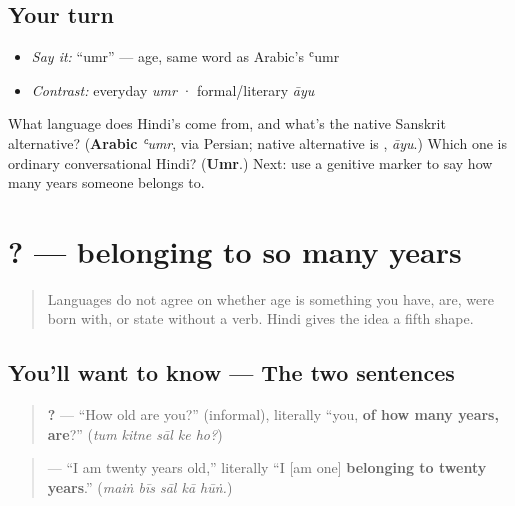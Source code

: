 \subsection*{Your turn}
\begin{itemize}
\raggedright
  \item \emph{Say it:} \textquotedblleft{}umr\textquotedblright{} — age, same word as Arabic's ʿumr
  \item \emph{Contrast:} everyday \emph{umr} · formal/literary \emph{āyu}
\end{itemize}

\begin{tcolorbox}[breakable,colback=teal!4,colframe=teal!35!black,title={Before you move on}]
What language does Hindi's \textbf{} come from, and what's the native Sanskrit alternative? (\textbf{Arabic} \emph{ʿumr}, via Persian; native alternative is \textbf{}, \emph{āyu}.) Which one is ordinary conversational Hindi? (\textbf{Umr}.) Next: use a genitive marker to say how many years someone belongs to.
\end{tcolorbox}
\section[\texorpdfstring{\hi{कितने} \hi{साल} \hi{के} \hi{हो}? … (kitne sāl ke ho?)}{कितने साल के हो? … (kitne sāl ke ho?)}]{   ? — belonging to so many years}

\label{lesson:HI-C19-age-grammar}



\begin{quote}
Languages do not agree on whether age is something you have, are, were born with, or state without a verb. Hindi gives the idea a fifth shape.
\end{quote}

\subsection*{You'll want to know — The two sentences}
\begin{quote}
\textbf{    ?} — \textquotedblleft{}How old are you?\textquotedblright{} (informal), literally \textquotedblleft{}you, \textbf{of how many years, are}?\textquotedblright{} (\emph{tum kitne sāl ke ho?})
\end{quote}

\begin{quote}
\textbf{    } — \textquotedblleft{}I am twenty years old,\textquotedblright{} literally \textquotedblleft{}I {[}am one{]} \textbf{belonging to twenty years}.\textquotedblright{} (\emph{maiṅ bīs sāl kā hūṅ.})
\end{quote}

